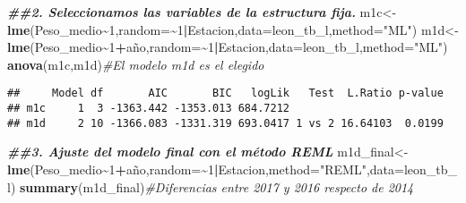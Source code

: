\documentclass[
]{article}
\newenvironment{Shaded}{\begin{snugshade}}{\end{snugshade}}
\newcommand{\AttributeTok}[1]{\textcolor[rgb]{0.13,0.29,0.53}{#1}}
\newcommand{\CommentTok}[1]{\textcolor[rgb]{0.56,0.35,0.01}{\textit{#1}}}
\newcommand{\DecValTok}[1]{\textcolor[rgb]{0.00,0.00,0.81}{#1}}
\newcommand{\DocumentationTok}[1]{\textcolor[rgb]{0.56,0.35,0.01}{\textbf{\textit{#1}}}}
\newcommand{\FunctionTok}[1]{\textcolor[rgb]{0.13,0.29,0.53}{\textbf{#1}}}
\newcommand{\NormalTok}[1]{#1}
\newcommand{\OtherTok}[1]{\textcolor[rgb]{0.56,0.35,0.01}{#1}}
\newcommand{\SpecialCharTok}[1]{\textcolor[rgb]{0.81,0.36,0.00}{\textbf{#1}}}
\newcommand{\StringTok}[1]{\textcolor[rgb]{0.31,0.60,0.02}{#1}}
\begin{document}
\begin{Shaded}
\begin{Highlighting}[]
\DocumentationTok{\#\#2. Seleccionamos las variables de la estructura fija.}
\NormalTok{m1c}\OtherTok{\textless{}{-}}\FunctionTok{lme}\NormalTok{(Peso\_medio}\SpecialCharTok{\textasciitilde{}}\DecValTok{1}\NormalTok{,}\AttributeTok{random=}\SpecialCharTok{\textasciitilde{}}\DecValTok{1}\SpecialCharTok{|}\NormalTok{Estacion,}\AttributeTok{data=}\NormalTok{leon\_tb\_l,}\AttributeTok{method=}\StringTok{"ML"}\NormalTok{)}
\NormalTok{m1d}\OtherTok{\textless{}{-}}\FunctionTok{lme}\NormalTok{(Peso\_medio}\SpecialCharTok{\textasciitilde{}}\DecValTok{1}\SpecialCharTok{+}\NormalTok{año,}\AttributeTok{random=}\SpecialCharTok{\textasciitilde{}}\DecValTok{1}\SpecialCharTok{|}\NormalTok{Estacion,}\AttributeTok{data=}\NormalTok{leon\_tb\_l,}\AttributeTok{method=}\StringTok{"ML"}\NormalTok{)}
\FunctionTok{anova}\NormalTok{(m1c,m1d)}\CommentTok{\#El modelo m1d es el elegido}
\end{Highlighting}
\end{Shaded}

\begin{verbatim}
##     Model df       AIC       BIC   logLik   Test  L.Ratio p-value
## m1c     1  3 -1363.442 -1353.013 684.7212                        
## m1d     2 10 -1366.083 -1331.319 693.0417 1 vs 2 16.64103  0.0199
\end{verbatim}

\begin{Shaded}
\begin{Highlighting}[]
\DocumentationTok{\#\#3. Ajuste del modelo final con el método REML}
\NormalTok{m1d\_final}\OtherTok{\textless{}{-}}\FunctionTok{lme}\NormalTok{(Peso\_medio}\SpecialCharTok{\textasciitilde{}}\DecValTok{1}\SpecialCharTok{+}\NormalTok{año,}\AttributeTok{random=}\SpecialCharTok{\textasciitilde{}}\DecValTok{1}\SpecialCharTok{|}\NormalTok{Estacion,}\AttributeTok{method=}\StringTok{"REML"}\NormalTok{,}\AttributeTok{data=}\NormalTok{leon\_tb\_l)}
\FunctionTok{summary}\NormalTok{(m1d\_final)}\CommentTok{\#Diferencias entre 2017 y 2016 respecto de 2014}
\end{Highlighting}
\end{Shaded}
\end{document}
